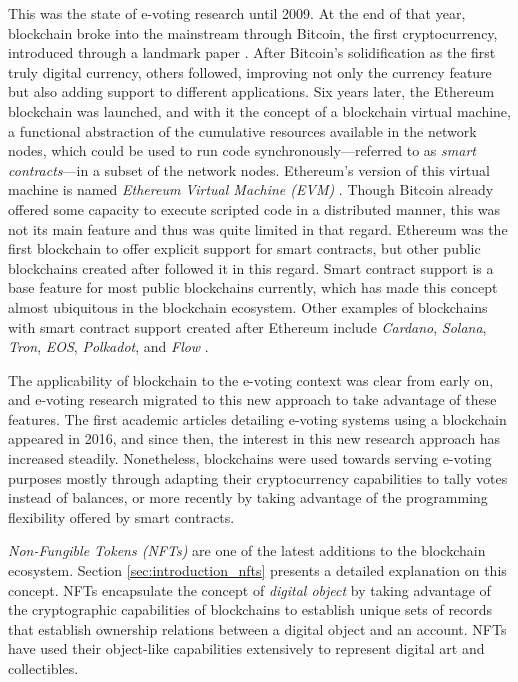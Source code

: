 \documentclass[../main.tex]{subfiles}
\begin{document}
\par
This was the state of e-voting research until 2009. At the end of that year, blockchain broke into the mainstream through Bitcoin, the first cryptocurrency, introduced through a landmark paper \cite{Nakamoto2008}. After Bitcoin's solidification as the first truly digital currency, others followed, improving not only the currency feature but also adding support to different applications. Six years later, the Ethereum blockchain \cite{Dannen2016} was launched, and with it the concept of a blockchain virtual machine, a functional abstraction of the cumulative resources available in the network nodes, which could be used to run code synchronously—referred to as \textit{smart contracts}—in a subset of the network nodes. Ethereum's version of this virtual machine is named \textit{Ethereum Virtual Machine (EVM)} \cite{Antonopoulos2018}. Though Bitcoin already offered some capacity to execute scripted code in a distributed manner, this was not its main feature and thus was quite limited in that regard. Ethereum was the first blockchain to offer explicit support for smart contracts, but other public blockchains created after followed it in this regard. Smart contract support is a base feature for most public blockchains currently, which has made this concept almost ubiquitous in the blockchain ecosystem. Other examples of blockchains with smart contract support created after Ethereum include \textit{Cardano}, \textit{Solana}, \textit{Tron}, \textit{EOS}, \textit{Polkadot}, and \textit{Flow} \cite{cointree2022}.
\par
The applicability of blockchain to the e-voting context was clear from early on, and e-voting research migrated to this new approach to take advantage of these features. The first academic articles detailing e-voting systems using a blockchain appeared in 2016, and since then, the interest in this new research approach has increased steadily. Nonetheless, blockchains were used towards serving e-voting purposes mostly through adapting their cryptocurrency capabilities to tally votes instead of balances, or more recently by taking advantage of the programming flexibility offered by smart contracts.
\par
\textit{Non-Fungible Tokens (NFTs)} are one of the latest additions to the blockchain ecosystem. Section \ref{sec:introduction_nfts} presents a detailed explanation on this concept. NFTs encapsulate the concept of \textit{digital object} by taking advantage of the cryptographic capabilities of blockchains to establish unique sets of records that establish ownership relations between a digital object and an account. NFTs have used their object-like capabilities extensively to represent digital art and collectibles.
\end{document}
